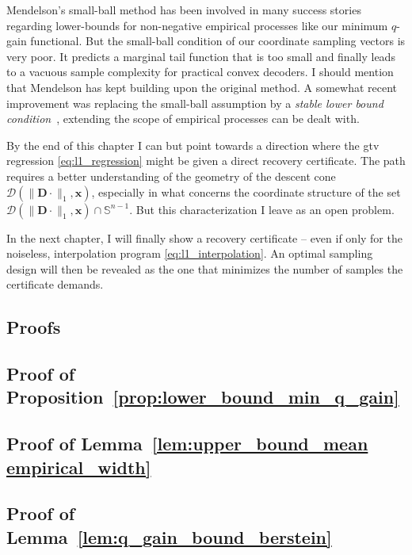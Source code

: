 Mendelson's small-ball method has been involved in many success stories regarding lower-bounds for non-negative empirical processes like our minimum $q$-gain functional. But the small-ball condition of our coordinate sampling vectors is very poor. It predicts a marginal tail function that is too small and finally leads to a vacuous sample complexity for practical convex decoders. I should mention that Mendelson has kept building upon the original method. A somewhat recent improvement was replacing the small-ball assumption by a \emph{stable lower bound condition}~\cite{mendelson2017}, extending the scope of empirical processes can be dealt with.

By the end of this chapter I can but point towards a direction where the \acrshort{gtv} regression \eqref{eq:l1_regression} might be given a direct recovery certificate. The path requires a better understanding of the geometry of the descent cone $\mathcal{D}( \|\mathbf{D} \cdot \|_1, \mathbf{x})$, especially in what concerns the coordinate structure of the set $\mathcal{D}( \|\mathbf{D} \cdot \|_1, \mathbf{x}) \cap \mathbb{S}^{n-1}$. But this characterization I leave as an open problem.

In the next chapter, I will finally show a recovery certificate -- even if only for the noiseless, interpolation program  \eqref{eq:l1_interpolation}. An optimal sampling design will then be revealed as the one that minimizes the number of samples the certificate demands.

\clearpage

\begin{subappendices}
    \section{Proofs}

    \subsection{Proof of Proposition~\ref{prop:lower_bound_min_q_gain}}
    \label{ap:proof_small_ball}
    

    \subsection{Proof of Lemma~\ref{lem:upper_bound_mean empirical_width}}
    \label{ap:proof_empirical_width_l1}
    

    \subsection{Proof of Lemma~\ref{lem:q_gain_bound_berstein}}
    \label{ap:proof_q_gain_bound_berstein}
    
\end{subappendices}